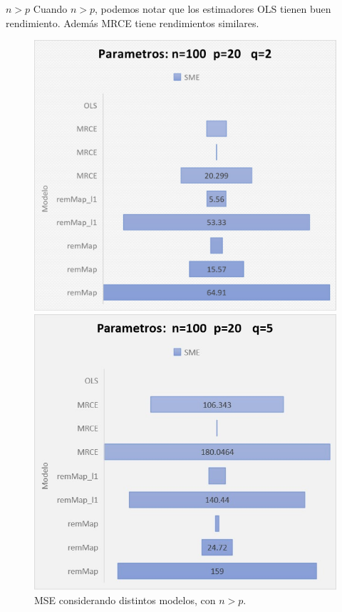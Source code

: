 \begin{frame}{$n>p$}
Cuando $n>p$, podemos notar que los estimadores OLS tienen buen rendimiento. Además MRCE tiene rendimientos similares.
 \begin{figure}[!htb]
   \includegraphics[scale=.4]{figure/im3.jpg}
  \caption{}
 \endminipage
   \includegraphics[scale=.4]{figure/im4.jpg}
  \caption{}
 \endminipage
\caption{MSE considerando distintos modelos, con $n>p$.}
 \end{figure}
\end{frame}


